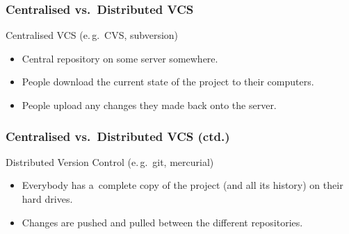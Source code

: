 \documentclass[12pt]{beamer}
\begin{document}
\begin{frame}
  \frametitle{Centralised vs.\ Distributed VCS }

    \begin{block}{Centralised VCS (e.\,g.\ CVS, subversion)}
      \begin{itemize}
        \item Central repository on some server somewhere.
        \item People download the current state of the project to their computers.
        \item People upload any changes they made back onto the server.
      \end{itemize}
    \end{block}
\end{frame}

\begin{frame}
  \frametitle{Centralised vs.\ Distributed VCS (ctd.)}

  \begin{block}{Distributed Version Control (e.\,g.\ git, mercurial)}
    \begin{itemize}
      \item Everybody has a~complete copy of the project (and all its history)
        on their hard drives.
      \item Changes are pushed and pulled between the different repositories.
    \end{itemize}
  \end{block}
\end{frame}
\end{document}
